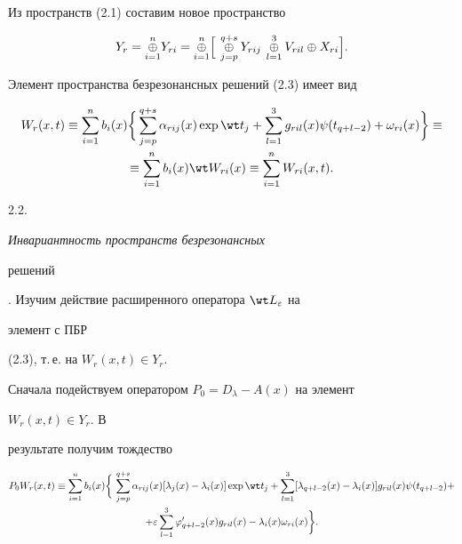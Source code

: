  


Из пространств (2.1) составим новое пространство 


\begin{equation} 


Y_r=\updown{n}{i=1}{\oplus}Y_{ri}= 


\updown{n}{i=1}{\oplus}\Big[\,\updown{q+s}{j=p}{\oplus} 


Y_{rij}\,\updown{3}{l=1}{\oplus}V_{ril}\oplus X_{ri}\Big]. 


\end{equation} 


Элемент пространства безрезонансных решений (2.3) имеет вид 


\begin{multline} 


W_r(x,t)\equiv\sum^n_{i=1}b_i(x)\biggl\{\,\sum^{q+s}_{j=p} 


\alpha_{rij}(x)\exp\wt t_j+\sum^3_{l=1}g_{ril}(x) 


\psi(t_{q+l-2})+\omega_{ri}(x)\biggr\}\equiv \\ 


\equiv\sum^n_{i=1}b_i(x)\wt W_{ri}(x) 


\equiv\sum^n_{i=1}W_{ri}(x,t). 


\end{multline} 


 


2.2. {\it Инвариантность пространств безрезонансных 


решений}. Изучим действие расширенного оператора $\wt L_\varepsilon$ на 


элемент с ПБР 


(2.3), т.\,е. на $W_r(x,t)\in Y_r$. 


Сначала подействуем оператором $P_0=D_\lambda-A(x)$ на элемент 


$W_r(x,t)\in Y_r$. В 


результате получим тождество 


\begin{multline} 


P_0W_r(x,t)\equiv\sum^n_{i=1}b_i(x)\bigg\{\, 


\sum^{q+s}_{j=p}\alpha_{rij}(x)[\lambda_j(x)-\lambda_i(x)] 


\exp\wt t_j+ \sum^3_{l=1}[\lambda_{q+l-2}(x)-\lambda_i(x)] 


g_{ril}(x)\psi(t_{q+l-2})+ \\ 


+\varepsilon\sum^3_{l=1}\varphi'_{q+l-2}(x)g_{ril}(x)-


\lambda_i(x)\omega_{ri}(x)\bigg\}. 


\end{multline} 


